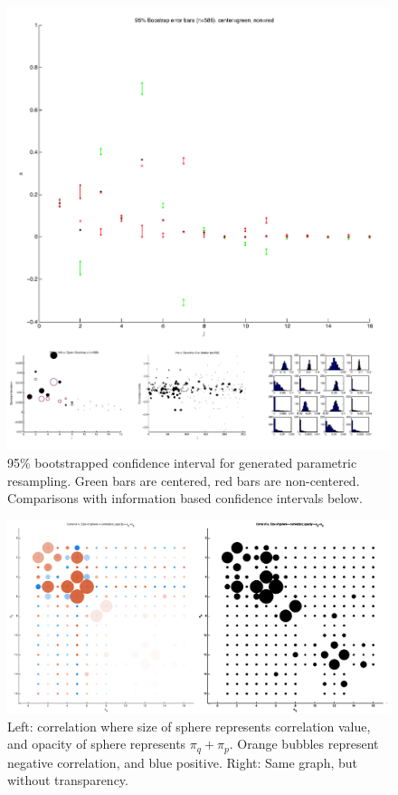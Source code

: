 \documentclass[12pt]{amsart}
\begin{document}
\begin{figure}[h!]
  \centering
    \includegraphics[width=1.1\textwidth]{g_bootstrap.pdf}
    \caption{95\% bootstrapped confidence interval for generated parametric resampling. Green bars are centered, red bars are non-centered. Comparisons with information based confidence intervals below.}
\end{figure}


\begin{figure}
	
	\begin{center}
		\includegraphics[scale=.75]{correlation_bmn_3.png}
	\end{center}
	\caption{Left: correlation where size of sphere represents correlation value, and opacity of sphere represents $\pi_q+\pi_p$. Orange bubbles represent negative correlation, and blue positive. Right: Same graph, but without transparency.}
\end{figure}
\end{document}
